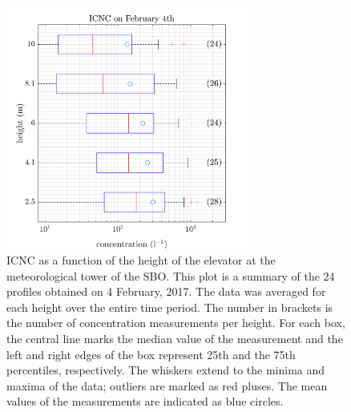 \documentclass[draft,linenumbers]{agujournal}
\begin{document}
\begin{figure}[t]
 \centering
 	\includegraphics[width=8cm]{0402_Total.png}
 \caption{ICNC as a function of the height of the elevator at the meteorological tower of the SBO. This plot is a summary of the 24 profiles obtained on 4 February, 2017. The data was averaged for each height over the entire time period. The number in brackets is the number of concentration measurements per height. For each box, the central line marks the median value of the measurement and the left and right edges of the box represent 25th and the 75th percentiles, respectively. The whiskers extend to the minima and maxima of the data; outliers are marked as red pluses. The mean values of the measurements are indicated as blue circles.}
 \label{fig:Total0402}
\end{figure}
\end{document}
